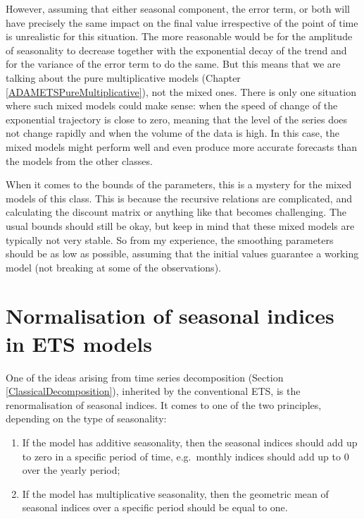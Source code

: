 \documentclass[
]{book}
\providecommand{\tightlist}{%
  \setlength{\itemsep}{0pt}\setlength{\parskip}{0pt}}
\theoremstyle{definition}
\theoremstyle{definition}
\theoremstyle{definition}
\theoremstyle{definition}
\theoremstyle{remark}
\begin{document}
However, assuming that either seasonal component, the error term, or both will have precisely the same impact on the final value irrespective of the point of time is unrealistic for this situation. The more reasonable would be for the amplitude of seasonality to decrease together with the exponential decay of the trend and for the variance of the error term to do the same. But this means that we are talking about the pure multiplicative models (Chapter \ref{ADAMETSPureMultiplicative}), not the mixed ones. There is only one situation where such mixed models could make sense: when the speed of change of the exponential trajectory is close to zero, meaning that the level of the series does not change rapidly and when the volume of the data is high. In this case, the mixed models might perform well and even produce more accurate forecasts than the models from the other classes.

When it comes to the bounds of the parameters, this is a mystery for the mixed models of this class. This is because the recursive relations are complicated, and calculating the discount matrix or anything like that becomes challenging. The usual bounds should still be okay, but keep in mind that these mixed models are typically not very stable. So from my experience, the smoothing parameters should be as low as possible, assuming that the initial values guarantee a working model (not breaking at some of the observations).

\hypertarget{ADAMETSSeasonalNormalisation}{%
\section{Normalisation of seasonal indices in ETS models}\label{ADAMETSSeasonalNormalisation}}

One of the ideas arising from time series decomposition (Section \ref{ClassicalDecomposition}), inherited by the conventional ETS, is the renormalisation of seasonal indices. It comes to one of the two principles, depending on the type of seasonality:

\begin{enumerate}
\def\labelenumi{\arabic{enumi}.}
\tightlist
\item
  If the model has additive seasonality, then the seasonal indices should add up to zero in a specific period of time, e.g.~monthly indices should add up to 0 over the yearly period;
\item
  If the model has multiplicative seasonality, then the geometric mean of seasonal indices over a specific period should be equal to one.
\end{enumerate}
\end{document}
